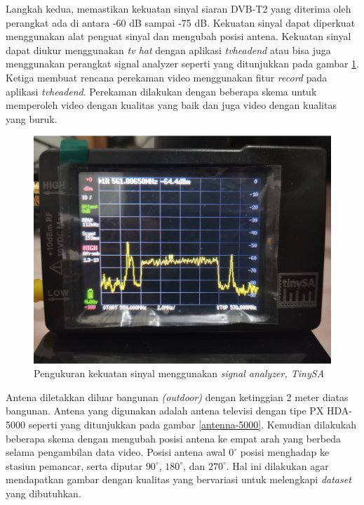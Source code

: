 Langkah kedua, memastikan kekuatan sinyal siaran DVB-T2 yang diterima oleh perangkat ada di antara -60 dB sampai -75 dB. Kekuatan sinyal dapat diperkuat menggunakan alat penguat sinyal dan mengubah posisi antena. Kekuatan sinyal dapat diukur menggunakan \textit{tv hat} dengan aplikasi \textit{tvheadend} atau bisa juga menggunakan perangkat signal analyzer seperti yang ditunjukkan pada gambar \ref{tiny-sa}. Ketiga membuat rencana perekaman video menggunakan fitur \textit{record} pada aplikasi \textit{tvheadend}. Perekaman dilakukan dengan beberapa skema untuk memperoleh video dengan kualitas yang baik dan juga video dengan kualitas yang buruk. 

\begin{figure}[H]
	\vspace{-0.1cm}
	\begin{center}
		\includegraphics[width=0.6\columnwidth]{bab4/Gambar/tiny-sa.png}
	\end{center}
	\vspace{-0.2cm}
	\caption{Pengukuran kekuatan sinyal menggunakan \textit{signal analyzer, TinySA}}
	\label{tiny-sa}
\end{figure}

Antena diletakkan diluar bangunan \textit{(outdoor)} dengan ketinggian 2 meter diatas bangunan. Antena yang digunakan adalah antena televisi dengan tipe PX HDA-5000 seperti yang ditunjukkan pada gambar \ref{antenna-5000}. Kemudian dilakukah beberapa skema dengan mengubah posisi antena ke empat arah yang berbeda  selama pengambilan data video. Posisi antena awal $0^\circ$  posisi menghadap ke stasiun pemancar, serta diputar $90^\circ$, $180^\circ$, dan $270^\circ$. Hal ini dilakukan agar mendapatkan gambar dengan kualitas yang bervariasi untuk melengkapi \textit{dataset} yang dibutuhkan.

